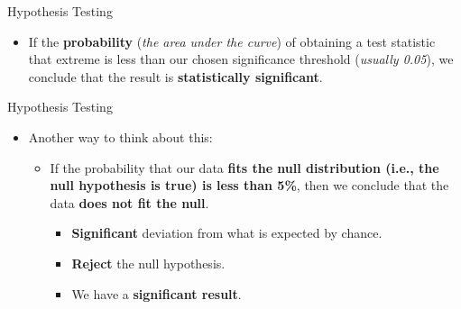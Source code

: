 \documentclass[
  ignorenonframetext,
]{beamer}
\providecommand{\tightlist}{%
  \setlength{\itemsep}{0pt}\setlength{\parskip}{0pt}}
\begin{document}
\begin{frame}{Hypothesis Testing}
\label{hypothesis-testing-2}
\begin{itemize}
\tightlist
\item
  If the \textbf{probability} (\emph{\emph{the area under the curve}})
  of obtaining a test statistic that extreme is less than our chosen
  significance threshold (\emph{\emph{usually 0.05}}), we conclude that
  the result is \textbf{statistically significant}.
\end{itemize}
\end{frame}

\begin{frame}{Hypothesis Testing}
\label{hypothesis-testing-3}
\begin{itemize}
\tightlist
\item
  Another way to think about this:

  \begin{itemize}
  \tightlist
  \item
    If the probability that our data \textbf{fits the null distribution
    (i.e., the null hypothesis is true) is less than 5\%}, then we
    conclude that the data \textbf{does not fit the null}.

    \begin{itemize}
    \tightlist
    \item
      \textbf{Significant} deviation from what is expected by chance.
    \item
      \textbf{Reject} the null hypothesis.
    \item
      We have a \textbf{significant result}.
    \end{itemize}
  \end{itemize}
\end{itemize}
\end{frame}
\end{document}
